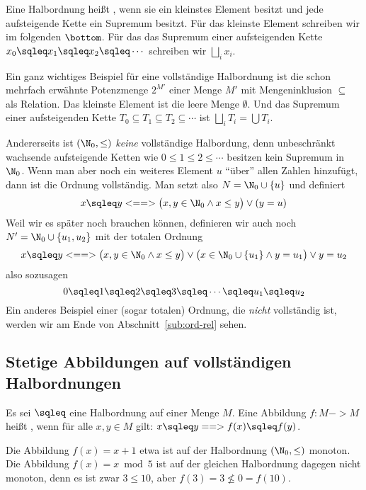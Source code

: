 Eine Halbordnung heißt , wenn sie ein kleinstes
Element besitzt und jede aufsteigende Kette ein Supremum besitzt. Für
das kleinste Element schreiben wir im folgenden $\bottom$.  Für das
das Supremum einer aufsteigenden Kette $x_0\sqleq x_1\sqleq x_2\sqleq
\cdots$ schreiben wir $\bigsqcup_i x_i$.

Ein ganz wichtiges Beispiel für eine vollständige Halbordnung ist die
schon mehrfach erwähnte Potenzmenge $2^{M'}$ einer Menge $M'$ mit
Mengeninklusion $\subseteq$ als Relation. Das kleinste Element ist die
leere Menge $\emptyset$. Und das Supremum einer aufsteigenden Kette
$T_0\subseteq T_1\subseteq T_2\subseteq \cdots$ ist $\bigsqcup_i
T_i=\bigcup T_i$.

Andererseits ist $(\N_0,\leq)$ \emph{keine} vollständige Halbordung,
denn unbeschränkt wachsende aufsteigende Ketten wie \zB $0 \leq 1\leq
2 \leq \cdots$ besitzen kein Supremum in $\N_0$. Wenn man aber noch
ein weiteres Element $u$ "`über"' allen Zahlen hinzufügt, dann ist die
Ordnung vollständig. Man setzt also $N=\N_0\cup\{u\}$ und definiert
\[
x \sqleq y <==> \bigl(x, y\in\N_0 \land x\leq y\bigr) \lor(y=u)
\]
Weil wir es später noch brauchen können, definieren wir auch noch
$N'=\N_0\cup\{u_1,u_2\}$ mit der totalen Ordnung
\[
x \sqleq y <==> \bigl(x, y\in\N_0 \land x\leq y\bigr)
\lor\bigl(x\in\N_0\cup\{u_1\}\land y=u_1\bigr) \lor y=u_2
\]
also sozusagen
\[
0 \sqleq 1 \sqleq 2 \sqleq 3 \sqleq \cdots \sqleq u_1 \sqleq u_2
\]
Ein anderes Beispiel einer (sogar totalen) Ordnung, die \emph{nicht}
vollständig ist, werden wir am Ende von Abschnitt~\ref{sub:ord-rel}
sehen.

\Tut\subsection{Stetige Abbildungen auf vollst\"andigen Halbordnungen}

Es sei $\sqleq$ eine Halbordnung auf einer Menge $M$. Eine Abbildung
$f:M-> M$ heißt , wenn für alle $x,y\in M$ gilt:
$x\sqleq y ==> f(x) \sqleq f(y)$.

Die Abbildung $f(x)=x+1$ etwa ist auf der Halbordnung $(\N_0,\leq)$
monoton. Die Abbildung $f(x)=x \bmod 5$ ist auf der gleichen
Halbordnung dagegen nicht monoton, denn es ist zwar $3\leq 10$, aber
$f(3)=3 \not\leq 0=f(10)$.


